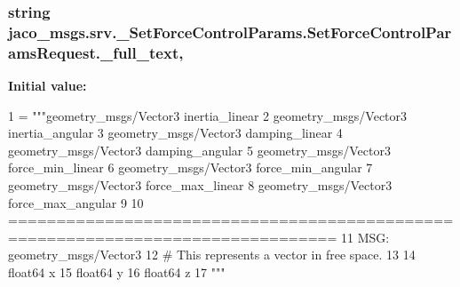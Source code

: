 \subsubsection[{\texorpdfstring{\+\_\+full\+\_\+text}{_full_text}}]{\setlength{\rightskip}{0pt plus 5cm}string jaco\+\_\+msgs.\+srv.\+\_\+\+Set\+Force\+Control\+Params.\+Set\+Force\+Control\+Params\+Request.\+\_\+full\+\_\+text\hspace{0.3cm}{\ttfamily [static]}, {\ttfamily [private]}}\hypertarget{classjaco__msgs_1_1srv_1_1__SetForceControlParams_1_1SetForceControlParamsRequest_a4b52d22476ea2c3fdfa6a415227fccbe}{}\label{classjaco__msgs_1_1srv_1_1__SetForceControlParams_1_1SetForceControlParamsRequest_a4b52d22476ea2c3fdfa6a415227fccbe}
{\bfseries Initial value\+:}
\begin{DoxyCode}
1 = \textcolor{stringliteral}{"""geometry\_msgs/Vector3 inertia\_linear}
2 \textcolor{stringliteral}{geometry\_msgs/Vector3 inertia\_angular}
3 \textcolor{stringliteral}{geometry\_msgs/Vector3 damping\_linear}
4 \textcolor{stringliteral}{geometry\_msgs/Vector3 damping\_angular}
5 \textcolor{stringliteral}{geometry\_msgs/Vector3 force\_min\_linear}
6 \textcolor{stringliteral}{geometry\_msgs/Vector3 force\_min\_angular}
7 \textcolor{stringliteral}{geometry\_msgs/Vector3 force\_max\_linear}
8 \textcolor{stringliteral}{geometry\_msgs/Vector3 force\_max\_angular}
9 \textcolor{stringliteral}{}
10 \textcolor{stringliteral}{================================================================================}
11 \textcolor{stringliteral}{MSG: geometry\_msgs/Vector3}
12 \textcolor{stringliteral}{# This represents a vector in free space. }
13 \textcolor{stringliteral}{}
14 \textcolor{stringliteral}{float64 x}
15 \textcolor{stringliteral}{float64 y}
16 \textcolor{stringliteral}{float64 z}
17 \textcolor{stringliteral}{"""}
\end{DoxyCode}
